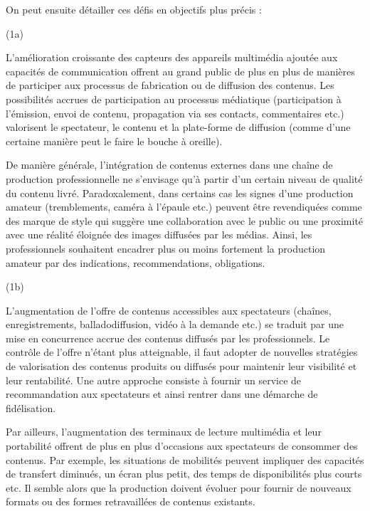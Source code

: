 On peut ensuite détailler ces défis en objectifs plus précis :
\begin{liste}
	\item[(1a)] 

	L'amélioration croissante des capteurs des appareils multimédia ajoutée aux capacités de communication offrent au grand public de plus en plus de manières de participer aux processus de fabrication ou de diffusion des contenus.
	Les possibilités accrues de participation au processus médiatique (participation à l'émission, envoi de contenu, propagation via ses contacts, commentaires etc.) valorisent le spectateur, le contenu et la plate-forme de diffusion (comme d'une certaine manière peut le faire le bouche à oreille).

	De manière générale, l'intégration de contenus externes dans une chaîne de production professionnelle ne s'envisage  qu'à partir d'un certain niveau de qualité du contenu livré.  
	Paradoxalement, dans certains cas les signes d'une production amateur (tremblements, caméra à l'épaule etc.) peuvent être revendiquées comme des marque de style qui suggère une collaboration avec le public ou une proximité avec une réalité éloignée des images diffusées par les médias.
	Ainsi, les professionnels souhaitent encadrer plus ou moins fortement la production amateur par des indications, recommendations, obligations.\\


	\item[(1b)] 

	L'augmentation de l'offre de contenus accessibles aux spectateurs (chaînes, enregistrements, balladodiffusion, vidéo à la demande etc.) se traduit par une mise en concurrence accrue des contenus diffusés par les professionnels.
	Le contrôle de l'offre n'étant plus atteignable, il faut adopter de nouvelles stratégies de valorisation des contenus produits ou diffusés pour maintenir leur visibilité et leur rentabilité. 
	Une autre approche consiste à fournir un service de recommandation aux spectateurs et ainsi rentrer dans une démarche de fidélisation. 

	Par ailleurs, l'augmentation des terminaux de lecture multimédia et leur portabilité offrent de plus en plus d'occasions aux spectateurs de consommer des contenus. 
	Par exemple, les situations de mobilités peuvent impliquer des capacités de transfert diminués, un écran plus petit, des temps de disponibilités plus courts etc.
	Il semble alors que la production doivent évoluer pour fournir de nouveaux formats ou des formes retravaillées de contenus existants.


\end{liste}

